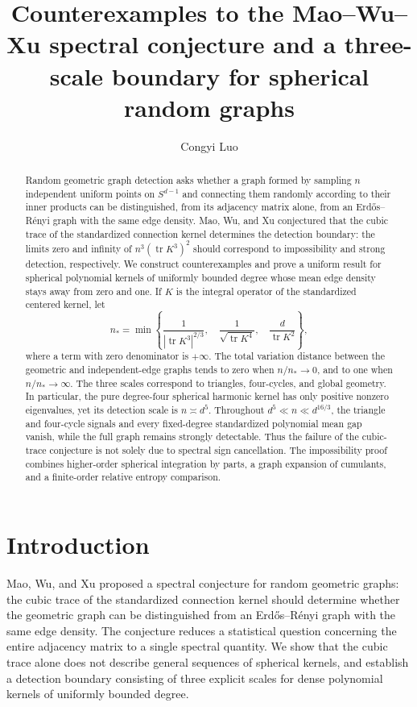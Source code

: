 \documentclass[11pt,reqno]{amsart}
\title[The spectral conjecture and three detection scales]{Counterexamples to the Mao--Wu--Xu spectral conjecture and a three-scale boundary for spherical random graphs}
\author{Congyi Luo}
\date{}
\numberwithin{equation}{section}
\theoremstyle{definition}
\theoremstyle{remark}
\theoremstyle{definition}
\DeclareMathOperator{\tr}{tr}
\begin{document}
\begin{abstract}
Random geometric graph detection asks whether a graph formed by sampling $n$ independent uniform points on $S^{d-1}$ and connecting them randomly according to their inner products can be distinguished, from its adjacency matrix alone, from an Erd\H{o}s--R\'enyi graph with the same edge density.
Mao, Wu, and Xu conjectured that the cubic trace of the standardized connection kernel determines the detection boundary: the limits zero and infinity of $n^3(\tr K^3)^2$ should correspond to impossibility and strong detection, respectively.
We construct counterexamples and prove a uniform result for spherical polynomial kernels of uniformly bounded degree whose mean edge density stays away from zero and one.
If $K$ is the integral operator of the standardized centered kernel, let
\[
 n_* =\min\left\{
 \frac{1}{|\tr K^3|^{2/3}},\quad
 \frac{1}{\sqrt{\tr K^4}},\quad
 \frac{d}{\tr K^2}
 \right\},
\]
where a term with zero denominator is $+\infty$.
The total variation distance between the geometric and independent-edge graphs tends to zero when $n/n_*\to0$, and to one when $n/n_*\to\infty$.
The three scales correspond to triangles, four-cycles, and global geometry.
In particular, the pure degree-four spherical harmonic kernel has only positive nonzero eigenvalues, yet its detection scale is $n\asymp d^5$.
Throughout $d^5\ll n\ll d^{16/3}$, the triangle and four-cycle signals and every fixed-degree standardized polynomial mean gap vanish, while the full graph remains strongly detectable.
Thus the failure of the cubic-trace conjecture is not solely due to spectral sign cancellation.
The impossibility proof combines higher-order spherical integration by parts, a graph expansion of cumulants, and a finite-order relative entropy comparison.
\end{abstract}
\maketitle
\section{Introduction}\label{sec:intro}
Mao, Wu, and Xu \cite{MWX} proposed a spectral conjecture for random geometric graphs:
the cubic trace of the standardized connection kernel should determine whether the geometric graph can be distinguished from an Erd\H{o}s--R\'enyi graph with the same edge density.
The conjecture reduces a statistical question concerning the entire adjacency matrix to a single spectral quantity.
We show that the cubic trace alone does not describe general sequences of spherical kernels,
and establish a detection boundary consisting of three explicit scales for dense polynomial kernels of uniformly bounded degree.
\end{document}
